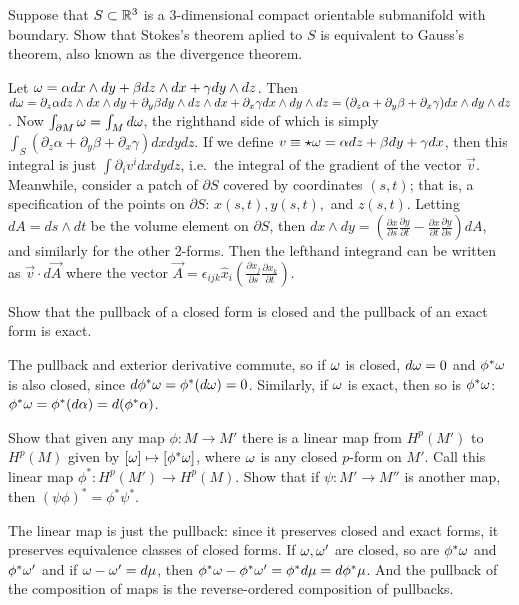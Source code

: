 \documentclass[a4paper,12pt]{report}
\numberwithin{equation}{section}
\begin{document}
\begin{p}%
{Suppose that $S\subset \mathbb{R}^3$ is a 3-dimensional compact orientable submanifold with boundary. Show that Stokes's theorem aplied to $S$ is equivalent to Gauss's theorem, also known as the divergence theorem.}
\end{p}
{Let $\omega=\alpha dx\wedge dy+\beta dz\wedge dx+\gamma dy\wedge dz$. Then $d\omega=\partial_z \alpha dz\wedge dx\wedge dy+\partial_y \beta dy\wedge dz\wedge dx+\partial_x \gamma dx\wedge dy\wedge dz=(\partial_z\alpha+\partial_y\beta+\partial_x \gamma)dx\wedge dy\wedge dz$. Now $\int_{\partial M}\omega=\int_M d\omega$, the righthand side of which is simply $\int_S(\partial_z\alpha+\partial_y\beta+\partial_x \gamma) dxdydz$. If we define
$v\equiv\star\omega=\alpha dz+\beta dy+\gamma dx$, then this integral is just $\int \partial_iv^i dxdydz$, i.e.~the integral of the gradient of the vector $\vec{v}$. Meanwhile, 
consider a patch of $\partial S$ covered by coordinates $(s,t)$; that is, a specification of the points on $\partial S$: $x(s,t), y(s,t),$ and $z(s,t)$. Letting $dA=ds\wedge dt$ be the volume element on $\partial S$, then $dx\wedge dy=(\frac{\partial x}{\partial s}\frac{\partial y}{\partial t}-\frac{\partial x}{\partial t}\frac{\partial y}{\partial s})dA$, and similarly for the other 2-forms. Then the lefthand integrand can be written as $\vec{v}\cdot d\vec{A}$ where the vector $\vec{A}=
\epsilon_{ijk}\hat{x}_i(\frac{\partial x_j}{\partial s}\frac{\partial x_k}{\partial t})$.}

\begin{p}%
{Show that the pullback of a closed form is closed and the pullback of an exact form is exact.}
\end{p}
{The pullback and exterior derivative commute, so if $\omega$ is closed, $d\omega=0$ and $\phi^*\omega$ is also closed, since $d\phi^*\omega=\phi^* (d\omega)=0$. 
Similarly, if $\omega$ is exact, then so is $\phi^*\omega$: $\phi^*\omega=\phi^*(d\alpha)=d(\phi^*\alpha)$.}

\begin{p}%
{Show that given any map $\phi:M\rightarrow M'$ there is a linear map 
from $H^p(M')$ to $H^p(M)$ given by $[\omega]\mapsto[\phi^*\omega]$, where
$\omega$ is any closed $p$-form on $M'$. Call this linear map $\phi^*:H^p(M')\rightarrow H^p(M)$. Show that if $\psi:M'\rightarrow M''$ is another map, then $(\psi\phi)^*=\phi^*\psi^*$.}
\end{p}
{The linear map is just the pullback:
since it preserves closed and exact forms, it preserves equivalence classes of closed forms. If
$\omega,\omega'$ are closed, so are $\phi^*\omega$ and $\phi^*\omega'$ and if $\omega-\omega'=d\mu$, then $\phi^*\omega-\phi^*\omega'=\phi^*d\mu=d\phi^*\mu$. And the pullback of the composition of maps is the reverse-ordered composition of pullbacks.}
\end{document}
